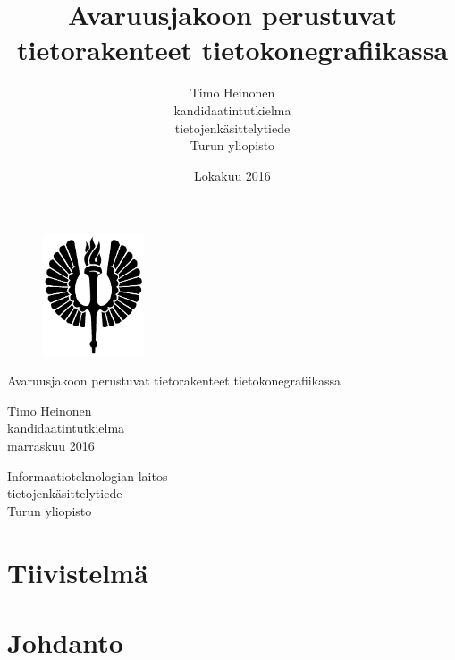 \documentclass[a4paper,12pt, titlepage]{article}
\title{Avaruusjakoon perustuvat tietorakenteet tietokonegrafiikassa}
\author{Timo Heinonen \\kandidaatintutkielma \\ tietojenkäsittelytiede \\ Turun yliopisto}
\date{Lokakuu 2016}
\theoremstyle{break}
\begin{document}
\thispagestyle{empty}
\begin{figure}
\includegraphics[width=3cm]{soihtu.png}
\vspace{4.0cm}
\end{figure}


\begin{center}\Large
Avaruusjakoon perustuvat tietorakenteet tietokonegrafiikassa
\end{center}

\begin{center}
Timo Heinonen\\
kandidaatintutkielma\\
marraskuu 2016
\end{center}

\begin{center}
Informaatioteknologian laitos\\
tietojenkäsittelytiede\\
Turun yliopisto\\
\end{center}

\begin{figure}[b]
\vspace*{-5.0cm}
\end{figure}

\newpage
{}%
\thispagestyle{empty}
\section*{Tiivistelmä}
\newpage


\tableofcontents


\newpage
\section{Johdanto}
\end{document}
